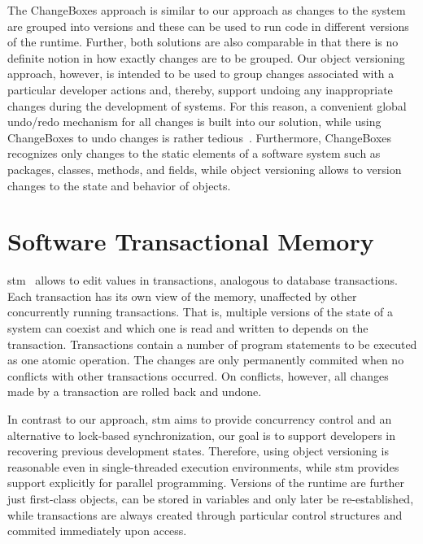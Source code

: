 The ChangeBoxes approach is similar to our approach as changes to the system are grouped into versions and these can be used to run code in different versions of the runtime.
Further, both solutions are also comparable in that there is no definite notion in how exactly changes are to be grouped.
Our object versioning approach, however, is intended to be used to group changes associated with a particular developer actions and, thereby, support undoing any inappropriate changes during the development of systems.
For this reason, a convenient global undo/redo mechanism for all changes is built into our solution, while using ChangeBoxes to undo changes is rather tedious~\cite{Steinert2012COE}.
Furthermore, ChangeBoxes recognizes only changes to the static elements of a software system such as packages, classes, methods, and fields, while object versioning allows to version changes to the state and behavior of objects.




\section{Software Transactional Memory}

\ac{stm}~\cite{Shavit1995STM} allows to edit values in transactions, analogous to database transactions.
Each transaction has its own view of the memory, unaffected by other concurrently running transactions.
That is, multiple versions of the state of a system can coexist and which one is read and written to depends on the transaction.
Transactions contain a number of program statements to be executed as one atomic operation.
The changes are only permanently commited when no conflicts with other transactions occurred.
On conflicts, however, all changes made by a transaction are rolled back and undone.

In contrast to our approach, \ac{stm} aims to provide concurrency control and an alternative to lock-based synchronization, our goal is to support developers in recovering previous development states.
Therefore, using object versioning is reasonable even in single-threaded execution environments, while \ac{stm} provides support explicitly for parallel programming.
Versions of the runtime are further just first-class objects, can be stored in variables and only later be re-established, while transactions are always created through particular control structures and commited immediately upon access.

